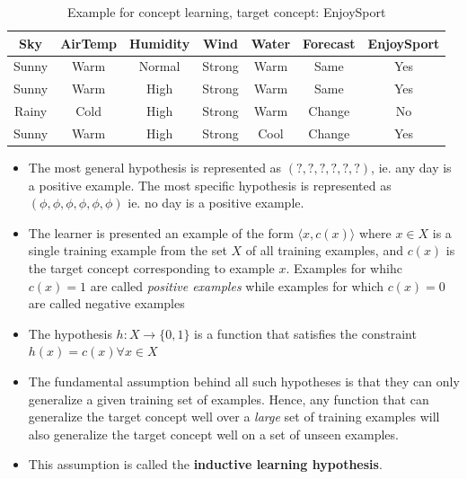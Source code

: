 \documentclass{article}
\theoremstyle{plain}
\theoremstyle{definition}
\begin{document}
\begin{table}[ht]
    \centering
    \begin{tabular}{|c|c|c|c|c|c|c|}
    \hline
        \textbf{Sky} & \textbf{AirTemp} & \textbf{Humidity} & \textbf{Wind} & \textbf{Water} & \textbf{Forecast} & \textbf{EnjoySport} \\
    \hline
        Sunny & Warm & Normal & Strong & Warm & Same & Yes\\
    \hline
        Sunny & Warm & High & Strong & Warm & Same & Yes \\
    \hline
        Rainy & Cold & High & Strong & Warm & Change & No \\
    \hline
        Sunny & Warm & High & Strong & Cool & Change & Yes \\
    \hline
    \end{tabular}
    \caption{Example for concept learning, target concept: EnjoySport}
    \label{tab:my_label}
\end{table}

\begin{itemize}
    \item The most general hypothesis is represented as $(?, ?, ?, ?, ?, ?)$, ie. any day is a positive example. The most specific hypothesis is represented as $(\phi, \phi, \phi, \phi, \phi, \phi)$ ie. no day is a positive example. 
    
    \item The learner is presented an example of the form $\langle x, c(x) \rangle$ where $x \in X$ is a single training example from the set $X$ of all training examples, and $c(x)$ is the target concept corresponding to  example $x$. Examples for whihc $c(x) = 1$ are called \textit{positive examples} while examples for which $c(x) = 0$ are called negative examples
    
    \item The hypothesis $h: X \rightarrow \{0, 1\}$ is a function that satisfies the constraint $h(x) = c(x) \forall x \in X$
    
    \item The fundamental assumption behind all such hypotheses is that they can only generalize a given training set of examples. Hence, any function that can generalize the target concept well over a \textit{large} set of training examples will also generalize the target concept well on a set of unseen examples.
    
    \item This assumption is called the \textbf{inductive learning hypothesis}.
\end{itemize}
\end{document}

